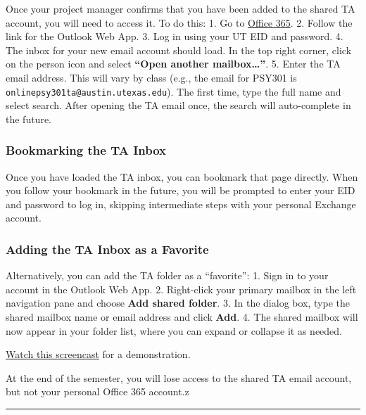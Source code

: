 \documentclass[
]{article}
\begin{document}
Once your project manager confirms that you have been added to the shared TA account, you will need to access it. To do this:
1. Go to \href{https://office365.austin.utexas.edu}{Office 365}.
2. Follow the link for the Outlook Web App.
3. Log in using your UT EID and password.
4. The inbox for your new email account should load. In the top right corner, click on the person icon and select \textbf{``Open another mailbox\ldots{}''}.
5. Enter the TA email address. This will vary by class (e.g., the email for PSY301 is \texttt{onlinepsy301ta@austin.utexas.edu}). The first time, type the full name and select search. After opening the TA email once, the search will auto-complete in the future.

\hypertarget{bookmarking-the-ta-inbox}{%
\subsubsection{Bookmarking the TA Inbox}\label{bookmarking-the-ta-inbox}}

Once you have loaded the TA inbox, you can bookmark that page directly. When you follow your bookmark in the future, you will be prompted to enter your EID and password to log in, skipping intermediate steps with your personal Exchange account.

\hypertarget{adding-the-ta-inbox-as-a-favorite}{%
\subsubsection{Adding the TA Inbox as a Favorite}\label{adding-the-ta-inbox-as-a-favorite}}

Alternatively, you can add the TA folder as a ``favorite'':
1. Sign in to your account in the Outlook Web App.
2. Right-click your primary mailbox in the left navigation pane and choose \textbf{Add shared folder}.
3. In the dialog box, type the shared mailbox name or email address and click \textbf{Add}.
4. The shared mailbox will now appear in your folder list, where you can expand or collapse it as needed.

\href{https://utexas.app.box.com/file/455642023256?s=el16kugfwchp7ymkne5fenl1qaye9kpo}{Watch this screencast} for a demonstration.

At the end of the semester, you will lose access to the shared TA email account, but not your personal Office 365 account.z

\begin{center}\rule{0.5\linewidth}{0.5pt}\end{center}
\end{document}
